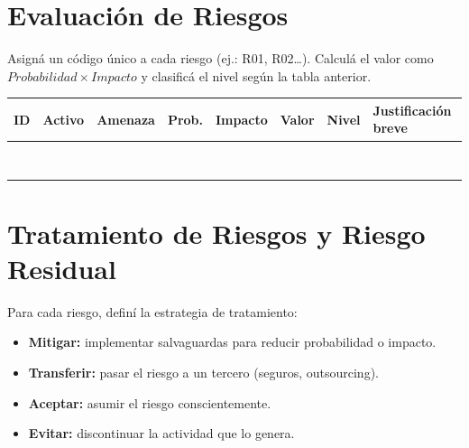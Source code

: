 \documentclass[11pt,a4paper]{article}
\begin{document}
\section{Evaluación de Riesgos}\label{sec:evaluacion}

Asigná un código único a cada riesgo (ej.: R01, R02\ldots). Calculá el valor como \(Probabilidad \times Impacto\) y clasificá el nivel según la tabla anterior.

\begin{center}
\small
\renewcommand{\arraystretch}{1.6}
\begin{tabularx}{\textwidth}{@{} >{\centering\arraybackslash}p{0.8cm} >{\centering\arraybackslash}p{1.2cm} >{\centering\arraybackslash}p{1.6cm} >{\centering\arraybackslash}p{1.1cm} >{\centering\arraybackslash}p{1.3cm} >{\centering\arraybackslash}p{1.1cm} >{\centering\arraybackslash}p{1.4cm} X @{}}
\toprule
\textbf{ID} & \textbf{Activo} & \textbf{Amenaza} & \textbf{Prob.} & \textbf{Impacto} & \textbf{Valor} & \textbf{Nivel} & \textbf{Justificación breve} \\
\midrule
 & & & & & & & \\
 & & & & & & & \\
 & & & & & & & \\
 & & & & & & & \\
 & & & & & & & \\
 & & & & & & & \\
 & & & & & & & \\
 & & & & & & & \\
\bottomrule
\end{tabularx}
\end{center}

\section{Tratamiento de Riesgos y Riesgo Residual}\label{sec:tratamiento}

Para cada riesgo, definí la estrategia de tratamiento:
\begin{itemize}[leftmargin=*]
  \item \textbf{Mitigar:} implementar salvaguardas para reducir probabilidad o impacto.
  \item \textbf{Transferir:} pasar el riesgo a un tercero (seguros, outsourcing).
  \item \textbf{Aceptar:} asumir el riesgo conscientemente.
  \item \textbf{Evitar:} discontinuar la actividad que lo genera.
\end{itemize}
\end{document}
